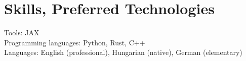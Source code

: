 \documentclass[a4paper,11pt]{article}
\makeatletter
\newcommand{\resumeProject}[4]{
\vspace{0.5mm}\item
    \begin{tabular*}{0.98\textwidth}[t]{l@{\extracolsep{\fill}}r}
        #1 & {\small{#3}} \\
        \small{{#2}} & \small{#4}
    \end{tabular*}
    \vspace{-2.4mm}
}
\newcommand{\resumeItemListStart}{\begin{justify}\begin{itemize}[leftmargin=3ex, rightmargin=2ex, noitemsep,labelsep=1.2mm,itemsep=0mm]\small}
\newcommand{\resumeSubHeadingListEnd}{\end{itemize}\vspace{2mm}}
\newcommand{\resumeItemListEnd}{\end{itemize}\end{justify}\vspace{-2mm}}
\makeatother
\begin{document}





\section{Skills, Preferred Technologies}
\begin{itemize}[leftmargin=0.1in, label={}]
  \small{\item{
        Tools{: JAX} \\
        Programming languages{: Python, Rust, C++} \\
        Languages{: English (professional), Hungarian (native), German (elementary)} \\
        }}
\end{itemize}
\vspace{-16pt}

\end{document}
